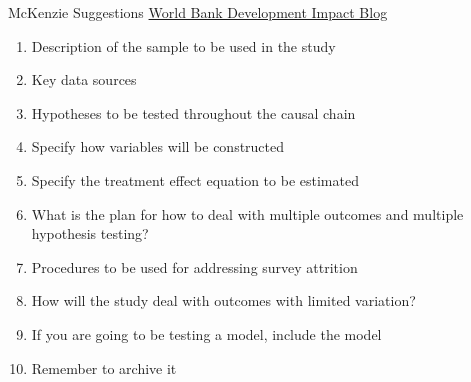 \documentclass{beamer}
\begin{document}

\begin{frame}{McKenzie Suggestions}
\href{http://blogs.worldbank.org/impactevaluations/a-pre-analysis-plan-checklist}{World Bank Development Impact Blog}

\begin{enumerate}[<.->]
\item
  Description of the sample to be used in the study
\item
  Key data sources
\item
  Hypotheses to be tested throughout the causal chain
\item
  Specify how variables will be constructed
\item
  Specify the treatment effect equation to be estimated
\item
  What is the plan for how to deal with multiple outcomes and multiple
  hypothesis testing?
\item
  Procedures to be used for addressing survey attrition
\item
  How will the study deal with outcomes with limited variation?
\item
  If you are going to be testing a model, include the model
\item
  Remember to archive it
\end{enumerate}
\end{frame}
\end{document}
